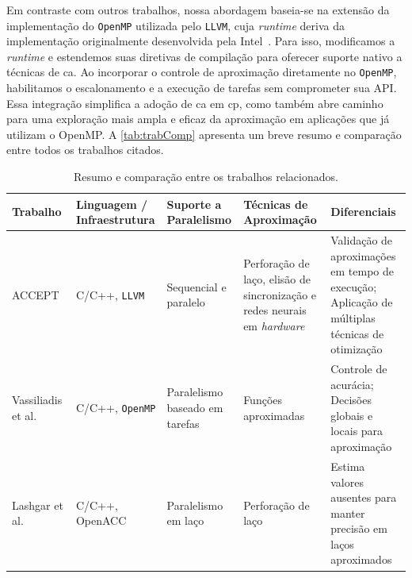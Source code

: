 Em contraste com outros trabalhos, nossa abordagem baseia-se na extensão da implementação do \texttt{OpenMP} utilizada pelo \texttt{LLVM}, cuja \textit{runtime} deriva da implementação originalmente desenvolvida pela Intel~\cite{openmpllvm}. Para isso, modificamos a \textit{runtime} e estendemos suas diretivas de compilação para oferecer suporte nativo a técnicas de \gls{ca}. Ao incorporar o controle de aproximação diretamente no \texttt{OpenMP}, habilitamos o escalonamento e a execução de tarefas sem comprometer sua API. Essa integração simplifica a adoção de \gls{ca} em \gls{cp}, como também abre caminho para uma exploração mais ampla e eficaz da aproximação em aplicações que já utilizam o OpenMP. A \autoref{tab:trabComp} apresenta um breve resumo e comparação entre todos os trabalhos citados.

\begin{table}[htb]
    \centering
    \caption{Resumo e comparação entre os trabalhos relacionados.}
    \begin{tabular}{|p{2.5cm}|p{2.7cm}|p{2cm}|p{2.7cm}|p{3.8cm}|}
        \hline
        \textbf{Trabalho}                         & \textbf{Linguagem / Infraestrutura} & \textbf{Suporte a Paralelismo} & \textbf{Técnicas de Aproximação}                                                                        & \textbf{Diferenciais}                                                                                                                                                      \\
        \hline
        ACCEPT~\cite{sampson2015}                 & C/C++, \texttt{LLVM}                         & Sequencial e paralelo          & Perforação de laço, elisão de sincronização e redes neurais em \textit{hardware}                        & Validação de aproximações em tempo de execução; Aplicação de múltiplas técnicas de otimização                                                                              \\
        \hline
        Vassiliadis et al.~\cite{vassiliadis2015} & C/C++, \texttt{OpenMP}                       & Paralelismo baseado em tarefas & Funções aproximadas                                                                                     & Controle de acurácia; Decisões globais e locais para aproximação                                                                                                           \\
        \hline
        Lashgar et al.~\cite{lashgar2018}         & C/C++, OpenACC                      & Paralelismo em laço            & Perforação de laço                                                                                      & Estima valores ausentes para manter precisão em laços aproximados                                                                                                          \\

\end{tabular}
\end{table}
